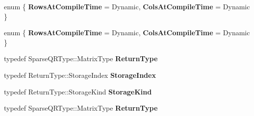 \begin{DoxyCompactItemize}
\item 
\mbox{\label{struct_eigen_1_1internal_1_1traits_3_01_sparse_q_r_matrix_q_return_type_3_01_sparse_q_r_type_01_4_01_4_ad4376af1fb498e37ba3521296fc65eec}} 
enum \{ {\bfseries Rows\+At\+Compile\+Time} = Dynamic, 
{\bfseries Cols\+At\+Compile\+Time} = Dynamic
 \}
\item 
\mbox{\label{struct_eigen_1_1internal_1_1traits_3_01_sparse_q_r_matrix_q_return_type_3_01_sparse_q_r_type_01_4_01_4_a7e61c8e82d2d820487c9891a4a5a9fcb}} 
enum \{ {\bfseries Rows\+At\+Compile\+Time} = Dynamic, 
{\bfseries Cols\+At\+Compile\+Time} = Dynamic
 \}
\item 
\mbox{\label{struct_eigen_1_1internal_1_1traits_3_01_sparse_q_r_matrix_q_return_type_3_01_sparse_q_r_type_01_4_01_4_a590365d451cdd97bf85150576de70d10}} 
typedef Sparse\+Q\+R\+Type\+::\+Matrix\+Type {\bfseries Return\+Type}
\item 
\mbox{\label{struct_eigen_1_1internal_1_1traits_3_01_sparse_q_r_matrix_q_return_type_3_01_sparse_q_r_type_01_4_01_4_a303535df1a3827af299a706d47a02bd4}} 
typedef Return\+Type\+::\+Storage\+Index {\bfseries Storage\+Index}
\item 
\mbox{\label{struct_eigen_1_1internal_1_1traits_3_01_sparse_q_r_matrix_q_return_type_3_01_sparse_q_r_type_01_4_01_4_a59f0fdbde763c7056db7e8f2b0c5ee9f}} 
typedef Return\+Type\+::\+Storage\+Kind {\bfseries Storage\+Kind}
\item 
\mbox{\label{struct_eigen_1_1internal_1_1traits_3_01_sparse_q_r_matrix_q_return_type_3_01_sparse_q_r_type_01_4_01_4_a590365d451cdd97bf85150576de70d10}} 
typedef Sparse\+Q\+R\+Type\+::\+Matrix\+Type {\bfseries Return\+Type}

\end{DoxyCompactItemize}
